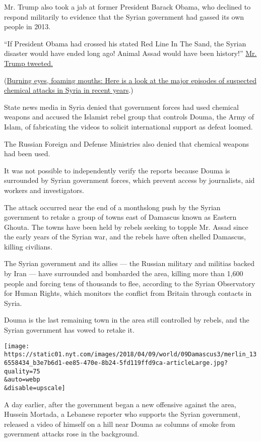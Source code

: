 Mr. Trump also took a jab at former President Barack Obama, who declined
to respond militarily to evidence that the Syrian government had gassed
its own people in 2013.

``If President Obama had crossed his stated Red Line In The Sand, the
Syrian disaster would have ended long ago! Animal Assad would have been
history!''
\href{https://twitter.com/realDonaldTrump/status/982969547283161090}{Mr.
Trump tweeted.}

(\href{https://www.nytimes.com/2018/04/08/world/middleeast/syria-chemical-attacks-assad.html}{Burning
eyes, foaming mouths: Here is a look at the major episodes of suspected
chemical attacks in Syria in recent years}.)

State news media in Syria denied that government forces had used
chemical weapons and accused the Islamist rebel group that controls
Douma, the Army of Islam, of fabricating the videos to solicit
international support as defeat loomed.

The Russian Foreign and Defense Ministries also denied that chemical
weapons had been used.

It was not possible to independently verify the reports because Douma is
surrounded by Syrian government forces, which prevent access by
journalists, aid workers and investigators.

The attack occurred near the end of a monthslong push by the Syrian
government to retake a group of towns east of Damascus known as Eastern
Ghouta. The towns have been held by rebels seeking to topple Mr. Assad
since the early years of the Syrian war, and the rebels have often
shelled Damascus, killing civilians.

The Syrian government and its allies --- the Russian military and
militias backed by Iran --- have surrounded and bombarded the area,
killing more than 1,600 people and forcing tens of thousands to flee,
according to the Syrian Observatory for Human Rights, which monitors the
conflict from Britain through contacts in Syria.

Douma is the last remaining town in the area still controlled by rebels,
and the Syrian government has vowed to retake it.

\texttt{[image: https://static01.nyt.com/images/2018/04/09/world/09Damascus3/merlin\_136558434\_b3e7b6d1-ee85-470e-8b24-5fd119ffd9ca-articleLarge.jpg?quality=75\\\&auto=webp\\\&disable=upscale]}

A day earlier, after the government began a new offensive against the
area, Hussein Mortada, a Lebanese reporter who supports the Syrian
government, released a video of himself on a hill near Douma as columns
of smoke from government attacks rose in the background.

